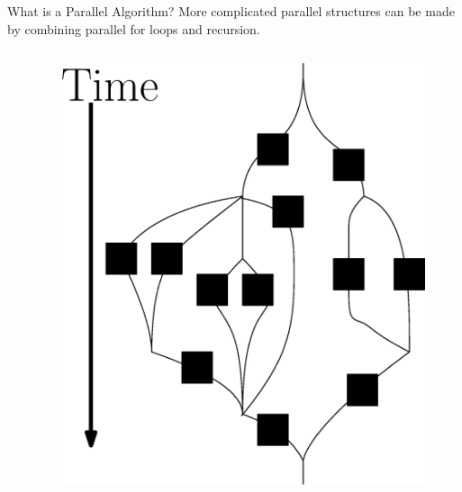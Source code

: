 \documentclass[xcolor=x11names, svgnames, rgb]{beamer}
\begin{document}
\begin{frame}[t]{What is a Parallel Algorithm?}
	More complicated parallel structures can be made by combining parallel for loops and recursion.
	\begin{columns}[T] %
	\begin{column}{.45\textwidth}
	\end{column}
	\hfill
	\begin{column}{.60\textwidth}
		\begin{figure}
			\includegraphics[width=0.8\linewidth]{imgs/parallelForLoop/altParallelForLoopComposition.eps}
		\end{figure}
	\end{column}
	\end{columns}
\end{frame}
\end{document}
